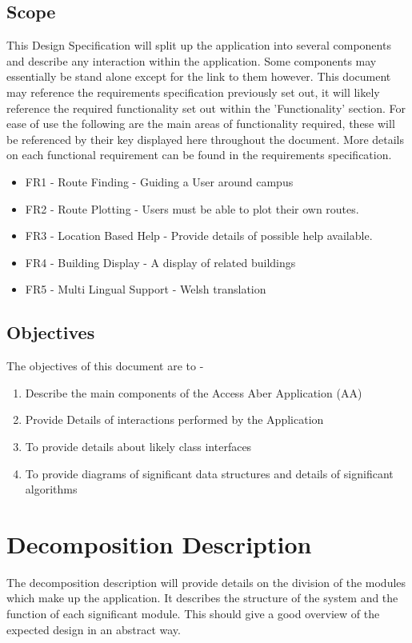 \documentclass[10pt,a4paper]{article}
\begin{document}
\subsection{Scope}
This Design Specification will split up the application into several components and describe any interaction within the application. Some components may essentially be stand alone except for the link to them however. This document may reference the requirements specification previously set out, it will likely reference the required functionality set out within the 'Functionality' section. For ease of use the following are the main areas of functionality required, these will be referenced by their key displayed here throughout the document. More details on each functional requirement can be found in the requirements specification.

\begin{itemize}
	\item FR1 - Route Finding - Guiding a User around campus
	\item FR2 - Route Plotting - Users must be able to plot their own routes.
	\item FR3 - Location Based Help - Provide details of possible help available.
	\item FR4 - Building Display - A display of related buildings
	\item FR5 - Multi Lingual Support - Welsh translation
\end{itemize}
 

\subsection{Objectives}
The objectives of this document are to - 
\begin{enumerate}
\item Describe the main components of the Access Aber Application (AA)
\item Provide Details of interactions performed by the Application
\item To provide details about likely class interfaces
\item To provide diagrams of significant data structures and details of significant algorithms 
\end{enumerate}
\newpage
\section{Decomposition Description}
The decomposition description will provide details on the division of the modules which make up the application. It describes the structure of the system and the function of each significant module. This should give a good overview of the expected design in an abstract way. 
\end{document}
